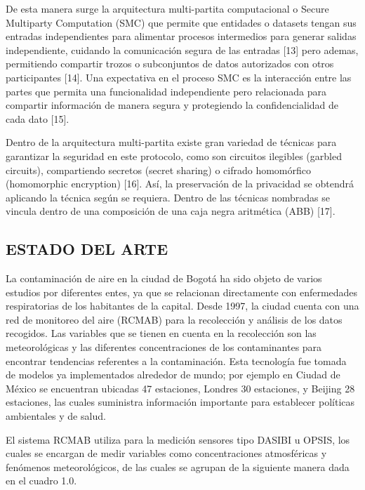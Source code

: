 \documentclass[a4paper, 12pt, oneside]{article}
\theoremstyle{definition}
\theoremstyle{remark}
\begin{document}
De esta manera surge la arquitectura multi-partita computacional o  Secure Multiparty Computation (SMC) que permite que entidades o datasets tengan sus entradas independientes para alimentar procesos intermedios para generar salidas independiente, cuidando la comunicación segura de las entradas [13] pero ademas, permitiendo compartir trozos o subconjuntos de datos autorizados con otros participantes  [14]. Una expectativa en el proceso SMC es la interacción entre las partes que permita una funcionalidad independiente pero relacionada para compartir información de manera segura y protegiendo la confidencialidad de cada dato [15].  

Dentro de la arquitectura multi-partita existe gran variedad de técnicas para garantizar la seguridad en este protocolo, como son circuitos ilegibles (garbled circuits), compartiendo secretos (secret sharing) o cifrado homomórfico (homomorphic encryption) [16]. Así, la preservación de la privacidad se obtendrá aplicando la técnica según se requiera. Dentro de las técnicas nombradas se vincula dentro de una composición de una caja negra aritmética (ABB) [17].

\subsection{ESTADO DEL ARTE}
La contaminación de aire en la ciudad de Bogotá ha sido objeto de varios estudios por diferentes entes, ya que se relacionan directamente con enfermedades respiratorias de los habitantes de la capital. Desde 1997, la ciudad cuenta con una red de monitoreo del aire (RCMAB) para la recolección y análisis de los datos recogidos. Las variables que se tienen en cuenta en la recolección son las meteorológicas y las diferentes concentraciones de los contaminantes para encontrar tendencias referentes a la contaminación. Esta tecnología fue tomada de modelos ya implementados alrededor de mundo; por ejemplo en Ciudad de México se encuentran ubicadas 47 estaciones, Londres 30 estaciones, y Beijing 28 estaciones, las cuales suministra información importante para establecer políticas ambientales y de salud.

El sistema RCMAB utiliza para la medición sensores tipo DASIBI u OPSIS, los cuales se encargan de medir variables  como concentraciones atmosféricas y fenómenos meteorológicos, de las cuales se agrupan de la siguiente manera dada en el cuadro 1.0.
\end{document}
